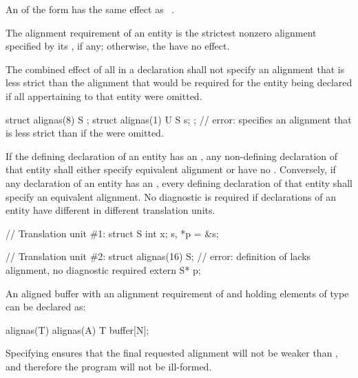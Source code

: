 \pnum
An  of the form
  \tcode{)} has the same
effect as  ~\tcode{))}.

\pnum
The alignment requirement of an entity is the strictest nonzero alignment
specified by its , if any;
otherwise, the  have no effect.

\pnum
The combined effect of all  in a declaration shall not
specify an alignment that is less strict than the alignment that would
be required for the entity being declared if all 
appertaining to that entity
were omitted.
\begin{example}
\begin{codeblock}
struct alignas(8) S {};
struct alignas(1) U {
  S s;
};  // error:  specifies an alignment that is less strict than if the  were omitted.
\end{codeblock}
\end{example}

\pnum
If the defining declaration of an entity has an
, any non-defining
declaration of that entity shall either specify equivalent alignment or have no
.
Conversely, if any declaration of an entity has an
,
every defining
declaration of that entity shall specify an equivalent alignment.
No diagnostic is required if declarations of an entity have
different 
in different translation units.
\begin{example}
\begin{codeblock}
// Translation unit \#1:
struct S { int x; } s, *p = &s;

// Translation unit \#2:
struct alignas(16) S;           // error: definition of  lacks alignment, no diagnostic required
extern S* p;
\end{codeblock}
\end{example}

\pnum
\begin{example} An aligned buffer with an alignment requirement
of  and holding  elements of type 
can be declared as:
\begin{codeblock}
alignas(T) alignas(A) T buffer[N];
\end{codeblock}
Specifying  ensures
that the final requested alignment will not be weaker than ,
and therefore the program will not be ill-formed.
\end{example}


